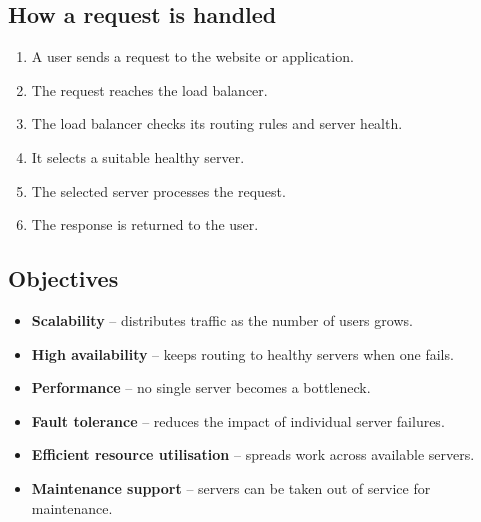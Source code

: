 \documentclass[11pt,a4paper]{article}
\begin{document}



\subsection{How a request is handled}

\begin{enumerate}\itemsep2pt
  \item A user sends a request to the website or application.
  \item The request reaches the load balancer.
  \item The load balancer checks its routing rules and server health.
  \item It selects a suitable healthy server.
  \item The selected server processes the request.
  \item The response is returned to the user.
\end{enumerate}

\subsection{Objectives}

\begin{itemize}\itemsep2pt
  \item \textbf{Scalability} -- distributes traffic as the number of users grows.
  \item \textbf{High availability} -- keeps routing to healthy servers when one fails.
  \item \textbf{Performance} -- no single server becomes a bottleneck.
  \item \textbf{Fault tolerance} -- reduces the impact of individual server failures.
  \item \textbf{Efficient resource utilisation} -- spreads work across available servers.
  \item \textbf{Maintenance support} -- servers can be taken out of service for maintenance.
\end{itemize}
\end{document}
